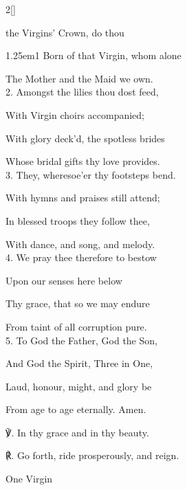 \begin{paracol}{2}[]
\sloppy

\firstEvensong


\firstEvensongHymn

 the Virgins' Crown, do thou


\begin{hangparas}{1.25em}{1}
Born of that Virgin, whom alone

The Mother and the Maid we own.\\

2. Amongst the lilies thou dost feed,

With Virgin choirs accompanied;

With glory deck'd, the spotless brides

Whose bridal gifts thy love provides.\\

3. They, wheresoe'er thy footsteps bend.

With hymns and praises still attend;

In blessed troops they follow thee,

With dance, and song, and melody.\\

4. We pray thee therefore to bestow

Upon our senses here below

Thy grace, that so we may endure

From taint of all corruption pure.\\

5. To God the Father, God the Son,

And God the Spirit, Three in One,

Laud, honour, might, and glory be

From age to age eternally. Amen.\\
\end{hangparas}

\newpage

℣. In thy grace and in thy beauty.

℟. Go forth, ride prosperously, and reign.

\begin{inhead}
	One Virgin
\end{inhead}


\end{paracol}
